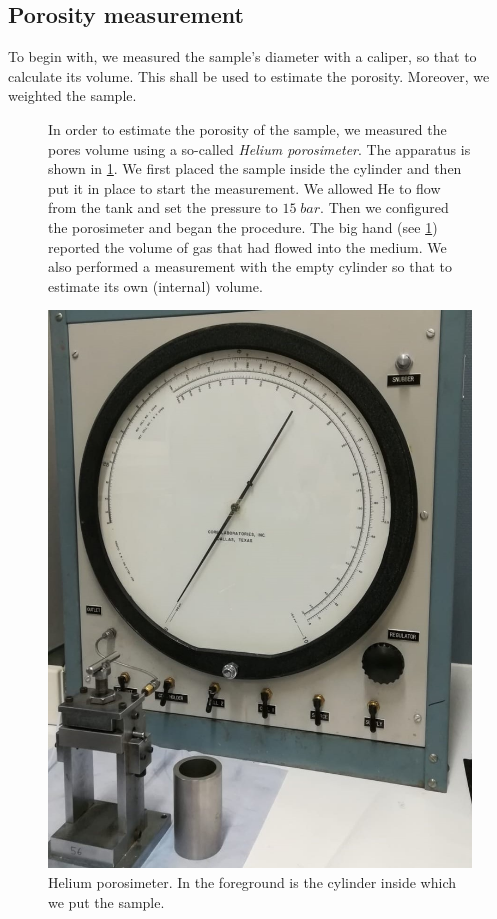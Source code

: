 \documentclass[10pt, a4paper]{amsart}
\begin{document}
\subsection{Porosity measurement}
To begin with, we measured the sample's diameter with a caliper, so that to calculate its volume. This shall be used to estimate the porosity. Moreover, we weighted the sample.
\begin{figure}[H]
    \centering
    \begin{minipage}{0.45\textwidth}
        In order to estimate the porosity of the sample, we measured the pores volume using a so-called \textit{Helium porosimeter}. The apparatus is shown in \cref{f:porosimeter}. We first placed the sample inside the cylinder and then put it in place to start the measurement. We allowed He to flow from the tank and set the pressure to $15\;bar$. Then we configured the porosimeter and began the procedure. The big hand (see \cref{f:porosimeter}) reported the volume of gas that had flowed into the medium. We also performed a measurement with the empty cylinder so that to estimate its own (internal) volume.
    \end{minipage}\hfill
    \begin{minipage}{0.5\textwidth}\centering
        \includegraphics[width=\textwidth]{porosimeter.jpeg}
        \caption{Helium porosimeter. In the foreground is the cylinder inside which we put the sample.}
        \label{f:porosimeter}
    \end{minipage}
\end{figure}
\end{document}
